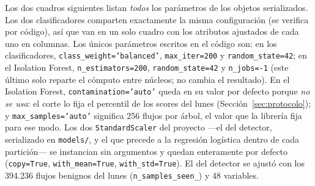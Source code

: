 \documentclass[11pt,a4paper]{article}
\begin{document}
Los dos cuadros siguientes listan \emph{todos} los parámetros de los objetos
serializados. Los dos clasificadores comparten exactamente la misma
configuración (se verifica por código), así que van en un solo cuadro con los
atributos ajustados de cada uno en columnas. Los únicos parámetros escritos en
el código son: en los clasificadores, \texttt{class\_weight='balanced'},
\texttt{max\_iter=200} y \texttt{random\_state=42}; en el Isolation Forest,
\texttt{n\_estimators=200}, \texttt{random\_state=42} y \texttt{n\_jobs=-1}
(este último solo reparte el cómputo entre núcleos; no cambia el resultado).
En el Isolation Forest, \texttt{contamination='auto'} queda en su valor por
defecto porque \emph{no se usa}: el corte lo fija el percentil de los scores
del lunes (Sección~\ref{sec:protocolo}); y \texttt{max\_samples='auto'}
significa 256 flujos por árbol, el valor que la librería fija para ese modo.
Los dos \texttt{StandardScaler} del proyecto ---el del detector, serializado en \texttt{models/}, y el que precede a la regresión logística dentro de cada partición--- se instancian sin argumentos y quedan enteramente por defecto (\texttt{copy=True}, \texttt{with\_mean=True}, \texttt{with\_std=True}). El del detector se ajustó con los 394.236 flujos benignos del lunes (\texttt{n\_samples\_seen\_}) y 48 variables.
\end{document}
